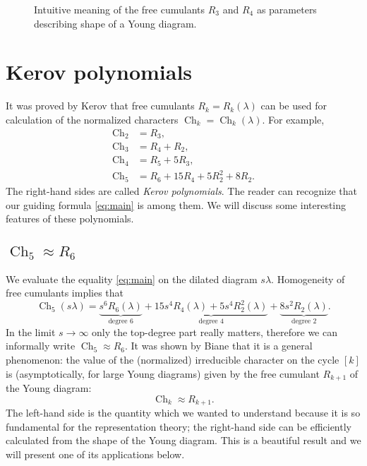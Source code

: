 \documentclass{emsprocart}
\theoremstyle{definition}
\begin{document}
\begin{figure}[t]

\caption{
Intuitive meaning of the free cumulants $R_3$ and $R_4$ as parameters describing shape of a Young diagram.}
\label{fig:r34}
\end{figure}

\section{Kerov polynomials}
\label{sec:kerov}

It was proved by Kerov that free cumulants $R_k=R_k(\lambda)$ can be used for calculation of the
normalized characters $\operatorname{Ch}_k=\operatorname{Ch}_k(\lambda)$. For example,
\begin{align*}
\operatorname{Ch}_2 &= R_3, \\
\operatorname{Ch}_3 &= R_4 + R_2,   \\
\operatorname{Ch}_4 &= R_5 + 5R_3,    \\     
\operatorname{Ch}_5 &= R_6 + 15R_4 + 5R_2^2 + 8R_2.
\end{align*}
The right-hand sides are called \emph{Kerov polynomials}.
The reader can recognize that our guiding formula \eqref{eq:main} is among them.
We will discuss some interesting features of these polynomials.

\subsection{$\operatorname{Ch}_5\approx R_6$}
We evaluate the equality \eqref{eq:main} on the dilated diagram $s\lambda$.
Homogeneity of free cumulants implies that
$$ \operatorname{Ch}_5(s\lambda) = \underbrace{s^6 R_6(\lambda)}_{\text{degree $6$}} + \underbrace{15 s^4 R_4(\lambda)+ 5s^4 R_2^2(\lambda)}_{\text{degree $4$}}  + \underbrace{8 s^2R_2(\lambda)}_{\text{degree $2$}}. $$
In the limit $s\to\infty$ only the top-degree part really matters, therefore we can informally write
$ \operatorname{Ch}_5 \approx R_6 $.
It was shown by Biane that it is a general phenomenon: the value of the (normalized) irreducible character on the cycle $[k]$ is (asymptotically, for large Young diagrams) given by the free cumulant $R_{k+1}$ of the Young diagram:
$$ \operatorname{Ch}_k \approx R_{k+1}. $$
The left-hand side is the quantity which we wanted to understand because it is so fundamental for the representation
theory; the right-hand side can be efficiently calculated from the shape of the Young diagram.
This is a beautiful result and we will present one of its applications below.
\end{document}
